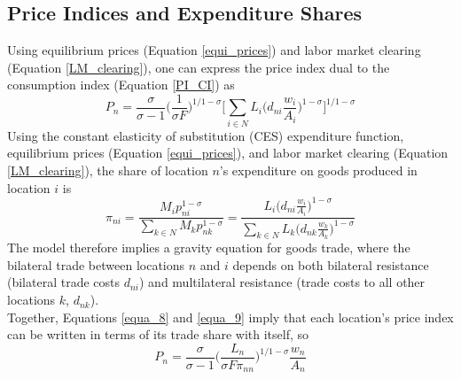 \documentclass[11pt]{article}
\begin{document}
\subsection*{Price Indices and Expenditure Shares}
Using equilibrium prices (Equation \ref{equi_prices}) and labor market clearing (Equation \ref{LM_clearing}), one can express the price index dual to the consumption index (Equation \ref{PI_CI}) as
\begin{equation}\label{equa_8}
P_{n} = \frac{\sigma}{\sigma - 1} \Big( \frac{1}{\sigma F} \Big)^{1/1-\sigma} \Big[ \sum_{i \in N} L_{i} \Big( d_{ni} \frac{w_{i}}{A_{i}} \Big)^{1-\sigma} \Big]^{1/1-\sigma}
\end{equation}
Using the constant elasticity of substitution (CES) expenditure function, equilibrium prices (Equation \ref{equi_prices}), and labor market clearing (Equation \ref{LM_clearing}), the share of location $n$’s expenditure on goods produced in location $i$ is
\begin{equation}\label{equa_9}
\pi_{ni} = \frac{M_{i} p_{ni}^{1-\sigma}}{\sum_{k \in N} M_{k} p_{nk}^{1-\sigma}} = \frac{L_{i} \Big( d_{ni} \frac{w_{i}}{A_{i}} \Big)^{1-\sigma}}{\sum_{k \in N} L_{k} \Big( d_{nk} \frac{w_{k}}{A_{k}} \Big)^{1-\sigma}}
\end{equation}
The model therefore implies a gravity equation for goods trade, where the bilateral trade between locations $n$ and $i$ depends on both bilateral resistance (bilateral trade costs $d_{ni}$) and multilateral resistance (trade costs to all other locations $k$, $d_{nk}$).\\
Together, Equations \ref{equa_8} and \ref{equa_9} imply that each location's price index can be written in terms of its trade share with itself, so
\begin{equation} \label{equa_10}
P_{n} = \frac{\sigma }{ \sigma - 1} \Big( \frac{L_{n}}{\sigma F \pi_{nn}} \Big)^{1/1-\sigma} \frac{w_{n}}{A_{n}}
\end{equation}
\end{document}
